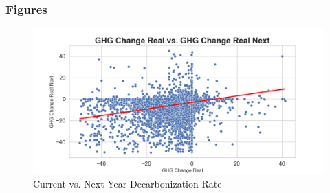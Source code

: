 



\subsubsection{Figures}

\begin{figure}[H]
\centering
  \includegraphics[width=\textwidth]{figures/ghg_change_real_vs_ghg_change_real_next.png}
\caption{Current vs. Next Year Decarbonization Rate}
\label{fig:ghg_change_real_vs_ghg_change_real_next}
\end{figure}

